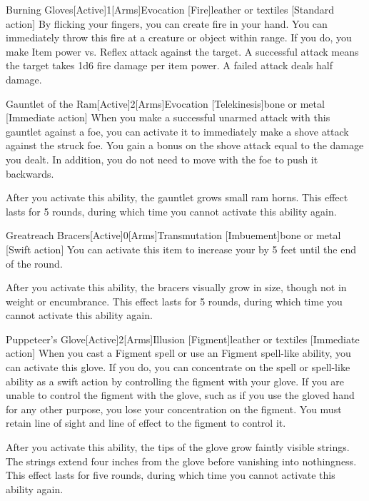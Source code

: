         \begin{magicitemdef}{Burning Gloves}[Active]{1}[Arms]{Evocation [Fire]}{leather or textiles}
            [Standard action] By flicking your fingers, you can create fire in your hand.
            You can immediately throw this fire at a creature or object within \rngmed range.
            If you do, you make Item power vs. Reflex attack against the target.
            A successful attack means the target takes 1d6 fire damage per item power.
            A failed attack deals half damage.
        \end{magicitemdef}

        \begin{magicitemdef}{Gauntlet of the Ram}[Active]{2}[Arms]{Evocation [Telekinesis]}{bone or metal}
            [Immediate action] When you make a successful unarmed attack with this gauntlet against a foe, you can activate it to immediately make a shove attack against the struck foe.
            You gain a bonus on the shove attack equal to the damage you dealt.
            In addition, you do not need to move with the foe to push it backwards.

            After you activate this ability, the gauntlet grows small ram horns.
            This effect lasts for 5 rounds, during which time you cannot activate this ability again.
        \end{magicitemdef}

        \begin{magicitemdef}{Greatreach Bracers}[Active]{0}[Arms]{Transmutation [Imbuement]}{bone or metal}
            [Swift action] You can activate this item to increase your  by 5 feet until the end of the round.

            After you activate this ability, the bracers visually grow in size, though not in weight or encumbrance.
            This effect lasts for 5 rounds, during which time you cannot activate this ability again.
        \end{magicitemdef}

        \begin{magicitemdef}{Puppeteer's Glove}[Active]{2}[Arms]{Illusion [Figment]}{leather or textiles}
            [Immediate action] When you cast a Figment spell or use an Figment spell-like ability, you can activate this glove.
            If you do, you can concentrate on the spell or spell-like ability as a swift action by controlling the figment with your glove.
            If you are unable to control the figment with the glove, such as if you use the gloved hand for any other purpose, you lose your concentration on the figment.
            You must retain line of sight and line of effect to the figment to control it.

            After you activate this ability, the tips of the glove grow faintly visible strings.
            The strings extend four inches from the glove before vanishing into nothingness.
            This effect lasts for five rounds, during which time you cannot activate this ability again.
        \end{magicitemdef}

